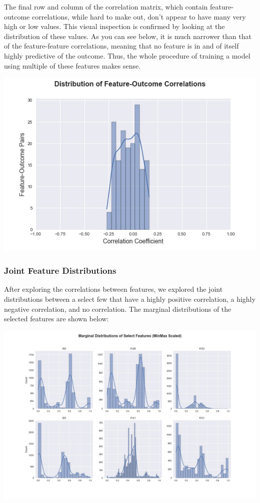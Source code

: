 \documentclass[12pt]{article}
\begin{document}
The final row and column of the correlation matrix, which contain feature-outcome correlations, while hard to make out, don't appear to have many very high or low values. This visual inspection is confirmed by looking at the distribution of these values. As you can see below, it is much narrower than that of the feature-feature correlations, meaning that no feature is in and of itself highly predictive of the outcome. Thus, the whole procedure of training a model using multiple of these features makes sense.

\begin{center}
\includegraphics[scale=0.5]{figures/feature_outcome_corr.jpg}
\end{center}

\subsubsection{Joint Feature Distributions}

After exploring the correlations between features, we explored the joint distributions between a select few that have a highly positive correlation, a highly negative correlation, and no correlation. The marginal distributions of the selected features are shown below:

\begin{center}
\includegraphics[scale=0.4]{figures/select_marginals.jpg}
\end{center}
\end{document}
